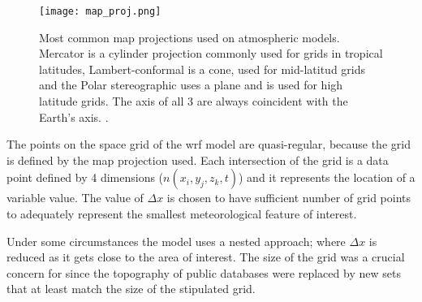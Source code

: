 \begin{figure}
    \centering
    \texttt{[image: map\_proj.png]}
    \caption{Most common map projections used on atmospheric models. Mercator is a cylinder projection commonly used for grids in tropical latitudes, Lambert-conformal is a cone, used for mid-latitud grids and the Polar stereographic uses a plane and is used for high latitude grids. The axis of all 3 are always coincident with the Earth's axis. \cite{warner2010numerical}.}
    \label{fig:map_projection}
\end{figure}


The points on the space grid of the \acrshort{wrf} model are quasi-regular, because the grid is defined by the map projection %
used. Each intersection of the grid is a data point defined by 4 dimensions (\textit{$n(x_{i},y_{j},z_{k},t)$}) and it represents the location of a variable value. %
The value of $\Delta x$ is chosen to have sufficient number of grid points to adequately represent the smallest meteorological feature of interest. \par

Under some circumstances the model uses a nested approach; where $\Delta x$ is reduced as it gets close to the area of interest. The size of the grid was a crucial concern for \cite{giannaros2018ultrahigh} since the topography of public databases were replaced by new sets that at least match the size of the stipulated grid.\par

